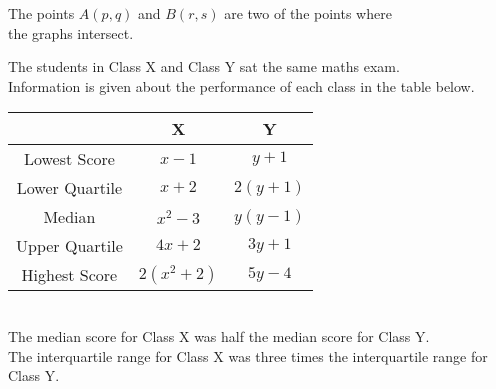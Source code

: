 \documentclass{exam}
\newenvironment{nscenter}
 {\parskip=0pt\par\nopagebreak\centering}
 {\par\noindent\ignorespacesafterend}
\begin{document}
\begin{questions}
\begin{nscenter}
    \end{nscenter}
    The points $A(p,q)$ and $B(r,s)$ are two of the points where\\ the graphs intersect.\\
    \newpage

    \question The students in Class X and Class Y sat the same maths exam.\\
    Information is given about the performance of each class in the table below.
    \begin{nscenter}
        \begin{tabular}{|c|c|c|}
            \hline
            & X & Y\\
            \hline
            Lowest Score & $x-1$ \phantom{1pt} & $y+1$ \phantom{1pt}\\
            \hline
            Lower Quartile & $x+2$ \phantom{1pt} & $2(y+1)$ \phantom{1pt}\\
            \hline
            Median & $x^2-3$ \phantom{1pt} & $y(y-1)$ \phantom{1pt}\\
            \hline
            Upper Quartile & $4x+2$ \phantom{1pt} & $3y+1$ \phantom{1pt}\\
            \hline
            Highest Score & $2(x^2+2)$ \phantom{1pt} & $5y-4$ \phantom{1pt}\\
            \hline
        \end{tabular}
    \end{nscenter}\\
    The median score for Class X was half the median score for Class Y.\\
    The interquartile range for Class X was three times the interquartile range for Class Y.\\


\end{questions}
\end{document}
